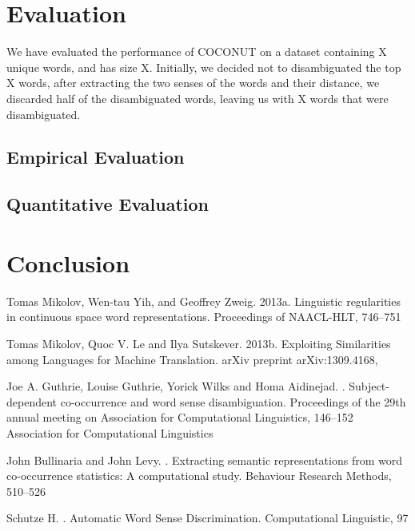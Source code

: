 \documentclass[11pt]{article}
\begin{document}
\section{Evaluation}
We have evaluated the performance of COCONUT on a dataset containing X unique words, and has size X. Initially, we decided not to disambiguated the top X words, after extracting the two senses of the words and their distance, we discarded half of the disambiguated words, leaving us with X words that were disambiguated. 

\subsection{Empirical Evaluation}


\subsection{Quantitative Evaluation}

\section{Conclusion}
\begin{thebibliography}{}

Tomas Mikolov, Wen-tau Yih, and Geoffrey Zweig.
\newblock 2013a.
\newblock Linguistic regularities in continuous space word representations.
\newblock Proceedings of NAACL-HLT, 
746--751

Tomas Mikolov, Quoc V. Le and Ilya Sutskever.
\newblock 2013b.
\newblock Exploiting Similarities among Languages for Machine Translation.
\newblock arXiv preprint arXiv:1309.4168, 

Joe A. Guthrie, Louise Guthrie, Yorick Wilks and Homa Aidinejad.
.
\newblock Subject-dependent co-occurrence and word sense disambiguation.
\newblock Proceedings of the 29th annual meeting on Association for Computational Linguistics, 
146--152
\newblock
Association for Computational Linguistics

John Bullinaria and John Levy.
.
\newblock Extracting semantic representations from word co-occurrence statistics: A computational study.
\newblock Behaviour Research Methods, 
510--526

Schutze H.
.
\newblock Automatic Word Sense Discrimination.
\newblock Computational Linguistic, 
97
\end{thebibliography}
\end{document}
